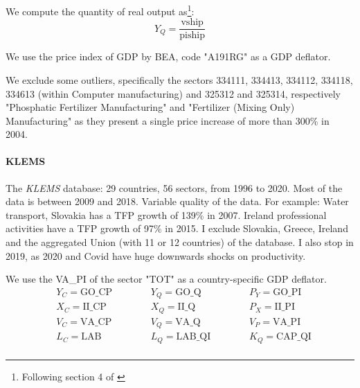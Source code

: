 We compute the quantity of real output as\footnote{Following section 4 of \cite{beckerNBERCESManufacturingIndustry2013}}: 
\begin{equation}
    Y_Q=\frac{\text{vship}}{\text{piship}}
\end{equation}

We use the price index of GDP by BEA, code "A191RG" as a GDP deflator.


We exclude some outliers, specifically the sectors 334111, 334413, 334112, 334118, 334613 (within Computer manufacturing) and 325312 and 325314, respectively "Phosphatic Fertilizer Manufacturing" and "Fertilizer (Mixing Only) Manufacturing" as they present a single price increase of more than 300\% in 2004.




\paragraph{KLEMS}

The \textit{KLEMS} database: 29 countries, 56 sectors, from 1996 to 2020. Most of the data is between 2009 and 2018. Variable quality of the data. For example: Water transport, Slovakia has a TFP growth of 139\% in 2007. Ireland professional activities have a TFP growth of 97\% in 2015. I exclude Slovakia, Greece, Ireland and the aggregated Union (with 11 or 12 countries) of the database. 
I also stop in 2019, as 2020 and Covid have huge downwards shocks on productivity. 

We use the VA\_PI of the sector "TOT" as a country-specific GDP deflator.
\begin{align*}
&Y_C = \text{GO\_CP} \hspace{1cm}& 
&Y_Q = \text{GO\_Q} \hspace{1cm}& 
&P_Y = \text{GO\_PI} \\
&X_C = \text{II\_CP} \hspace{1cm}& 
&X_Q = \text{II\_Q} \hspace{1cm}& 
&P_X = \text{II\_PI} \\
&V_C = \text{VA\_CP} \hspace{1cm}& 
&V_Q = \text{VA\_Q} \hspace{1cm}& 
&V_P = \text{VA\_PI} \\
&L_C = \text{LAB} \hspace{1cm}& 
&L_Q = \text{LAB\_QI} \hspace{1cm}& 
&K_Q = \text{CAP\_QI} \\
\end{align*}


